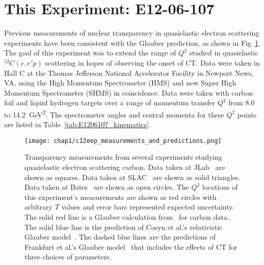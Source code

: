 \section{This Experiment: E12-06-107}
Previous measurements of nuclear transparency in quasielastic electron
scattering experiments have been consistent with the Glauber prediction, as
shown in Fig~\ref{fig:c12eep_transparency_intro}.
The goal of this experiment was to extend the range of $Q^2$ studied
in quasielastic ${}^{12}C(e,e'p)$ scattering in hopes of observing the onset
of CT.
Data were taken in Hall C at the Thomas Jefferson National Accelerator Facility
in Newport News, VA, using the High Momentum Spectrometer (HMS) and new Super
High Momentum Spectrometer (SHMS) in coincidence.
Data were taken with carbon foil and liquid hydrogen targets over a range of
momentum transfer $Q^2$ from 8.0 to \SI{14.2}{\giga\electronvolt\squared}.
The spectrometer angles and central momenta for these $Q^2$ points are listed in Table~\ref{tab:E1206107_kinematics}.

\begin{figure}[!h]
    \centering
    \texttt{[image: chap1/c12eep\_measurements\_and\_predictions.png]}
    \caption[Transparency measurements from several experiments studying
             quasielastic electron scattering carbon.]{Transparency measurements from several experiments studying
             quasielastic electron scattering carbon.
             Data taken at JLab~\cite{Abbot_1998, Garrow_2002, Rohe_2005} are shown as squares.
             Data taken at SLAC~\cite{Makins_1994, ONeill_1995} are shown as solid triangles.
             Data taken at Bates~\cite{Garino_1992} are shown as open circles.
             The $Q^2$ locations of this experiment's measurements are shown as
             red circles with arbitrary $T$ values and error bars represented
             expected uncertainty.
             The solid red line is a Glauber calculation from~\cite{Pandharipande_1992} for carbon data.
             The solid blue line is the prediction of Cosyn et al.'s
             relativistic Glauber model~\cite{Cosyn_2006, Cosyn_2008}.
             The dashed blue lines are the predictions of Frankfurt et al.'s
             Glauber model~\cite{Frankfurt_1995_PRC} that includes the effects of CT for three choices of
             parameters.
            }
    \label{fig:c12eep_transparency_intro}
\end{figure}

